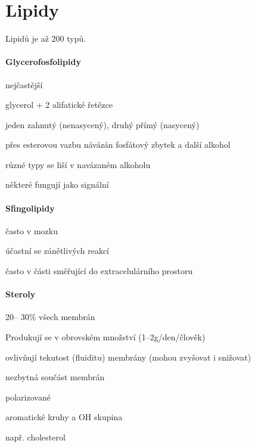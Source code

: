 \documentclass[DIV=8]{scrreprt}
\begin{document}
\section{Lipidy} \label{Lipidy} \FloatBarrier


Lipidů je až 200 typů.

\paragraph{Glycerofosfolipidy}
\begin{myItemize}[nosep]
    \item nejčastější
    \item glycerol + 2 alifatické řetězce
\begin{myItemize}[nosep]
    \item jeden zahnutý (nenasycený), druhý přímý (nasycený)
\end{myItemize}

    \item přes esterovou vazbu návázán fosfátový zbytek a další alkohol
    \item různé typy se liší v navázaném alkoholu
    \item některé fungují jako signální
\end{myItemize}



\paragraph{Sfingolipidy}
\begin{myItemize}[nosep]
    \item často v mozku
    \item účastní se zánětlivých reakcí
    \item často v části směřující do extracelulárního prostoru
\end{myItemize}



\paragraph{Steroly}
\begin{myItemize}[nosep]
    \item 20-- 30\% všech membrán
    \item Produkují se v obrovském množství (1--2g/den/člověk)
    \item ovlivňují tekutost (fluiditu) membrány (mohou zvyšovat i snižovat)
    \item nezbytná součást membrán
    \item polarizované
    \item aromatické kruhy a OH skupina
    \item např. cholesterol
\end{myItemize}
\end{document}
